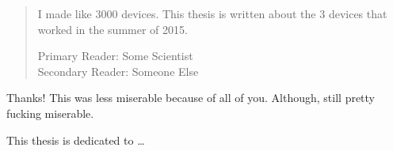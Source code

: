 
\begin{frontmatter}

\maketitle

\begin{abstract}

I made like 3000 devices. This thesis is written about the 3 devices that worked in the summer of 2015.

\vspace{1cm}

\noindent Primary Reader: Some Scientist\\
Secondary Reader: Someone Else

\end{abstract}

\begin{acknowledgment}

Thanks! This was less miserable because of all of you. Although, still pretty fucking miserable.

\end{acknowledgment}

\begin{dedication}
 
This thesis is dedicated to \ldots

\end{dedication}

\tableofcontents





\listoftables

\listoffigures

\end{frontmatter}
